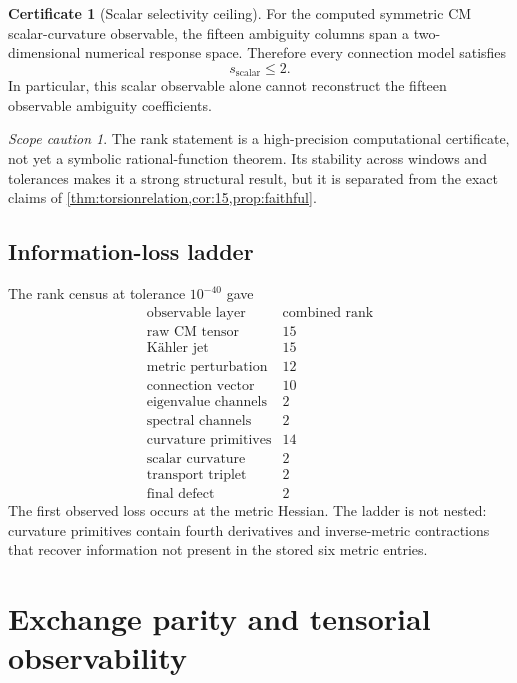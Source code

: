 \documentclass[11pt]{article}
\theoremstyle{definition}
\newtheorem{certificate}[theorem]{Certificate}
\theoremstyle{remark}
\newtheorem{caution}[theorem]{Scope caution}
\begin{document}
\begin{certificate}[Scalar selectivity ceiling]\label{cert:rank2}
For the computed symmetric CM scalar-curvature observable, the fifteen ambiguity columns span a two-dimensional numerical response space.  Therefore every connection model satisfies
\[
s_{\mathrm{scalar}}\le2.
\]
In particular, this scalar observable alone cannot reconstruct the fifteen observable ambiguity coefficients.
\end{certificate}

\begin{caution}
The rank statement is a high-precision computational certificate, not yet a symbolic rational-function theorem.  Its stability across windows and tolerances makes it a strong structural result, but it is separated from the exact claims of \cref{thm:torsionrelation,cor:15,prop:faithful}.
\end{caution}

\subsection{Information-loss ladder}

The rank census at tolerance $10^{-40}$ gave
\begin{equation}\label{eq:rankladder}
\begin{array}{c|c}
\text{observable layer}&\text{combined rank}\\
\hline
\text{raw CM tensor}&15\\
\text{K\"ahler jet}&15\\
\text{metric perturbation}&12\\
\text{connection vector}&10\\
\text{eigenvalue channels}&2\\
\text{spectral channels}&2\\
\text{curvature primitives}&14\\
\text{scalar curvature}&2\\
\text{transport triplet}&2\\
\text{final defect}&2
\end{array}
\end{equation}
The first observed loss occurs at the metric Hessian.  The ladder is not nested: curvature primitives contain fourth derivatives and inverse-metric contractions that recover information not present in the stored six metric entries.

\section{Exchange parity and tensorial observability}
\end{document}
